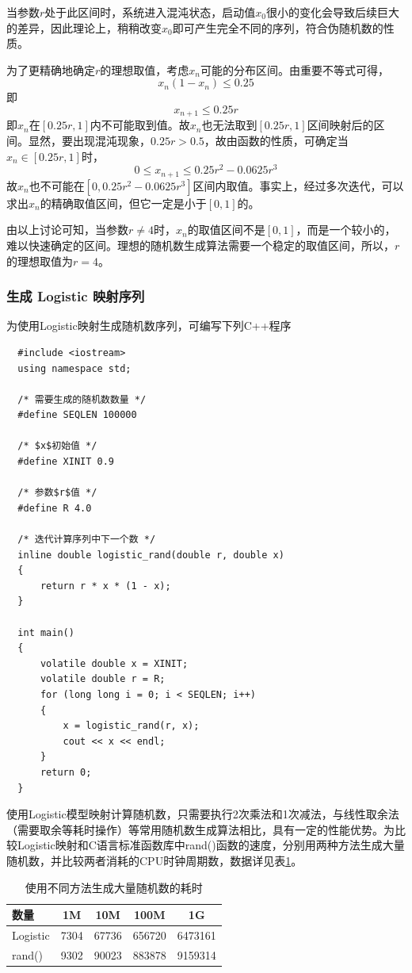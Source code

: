 \documentclass[UTF8]{ctexart}
\begin{document}
当参数$r$处于此区间时，系统进入混沌状态，启动值$x_0$很小的变化会导致后续巨大的差异，因此理论上，稍稍改变$x_0$即可产生完全不同的序列，符合伪随机数的性质。

为了更精确地确定$r$的理想取值，考虑$x_n$可能的分布区间。由重要不等式可得，
\[
x_n(1-x_n)\leq 0.25
\]
即
\[
x_{n+1} \leq 0.25r
\]
即$x_n$在$[0.25r, 1]$内不可能取到值。故$x_n$也无法取到$[0.25r, 1]$区间映射后的区间。显然，要出现混沌现象，$0.25r>0.5$，故由函数的性质，可确定当$x_n\in[0.25r, 1]$时，
\[
0 \leq x_{n+1} \leq 0.25r^2-0.0625r^3
\]
故$x_n$也不可能在$[0, 0.25r^2-0.0625r^3]$区间内取值。事实上，经过多次迭代，可以求出$x_n$的精确取值区间，但它一定是小于$[0, 1]$的。

由以上讨论可知，当参数$r \ne 4$时，$x_n$的取值区间不是$[0, 1]$，而是一个较小的，难以快速确定的区间。理想的随机数生成算法需要一个稳定的取值区间，所以，$r$的理想取值为$r=4$。

\subsubsection{生成 Logistic 映射序列}

为使用Logistic映射生成随机数序列，可编写下列C++程序
\begin{verbatim}
  #include <iostream>
  using namespace std;
  
  /* 需要生成的随机数数量 */
  #define SEQLEN 100000
  
  /* $x$初始值 */
  #define XINIT 0.9
  
  /* 参数$r$值 */
  #define R 4.0 
  
  /* 迭代计算序列中下一个数 */
  inline double logistic_rand(double r, double x)
  {
      return r * x * (1 - x);
  }
  
  int main()
  {
      volatile double x = XINIT;
      volatile double r = R;
      for (long long i = 0; i < SEQLEN; i++)
      {
          x = logistic_rand(r, x);
          cout << x << endl;
      }
      return 0;
  }
\end{verbatim}

使用Logistic模型映射计算随机数，只需要执行2次乘法和1次减法，与线性取余法（需要取余等耗时操作）等常用随机数生成算法相比，具有一定的性能优势。为比较Logistic映射和C语言标准函数库中rand()函数的速度，分别用两种方法生成大量随机数，并比较两者消耗的CPU时钟周期数，数据详见表\ref{randomgenerationclock}。

\begin{table}[h]
\centering
\caption{使用不同方法生成大量随机数的耗时}
\label{randomgenerationclock}
\begin{tabular}{ l || c c c c}
数量       & 1M & 10M   & 100M   & 1G      \\ \hline
Logistic & 7304 & 67736 & 656720 & 6473161 \\
rand()   & 9302 & 90023 & 883878 & 9159314 \\
\end{tabular}
\end{table}
\end{document}

